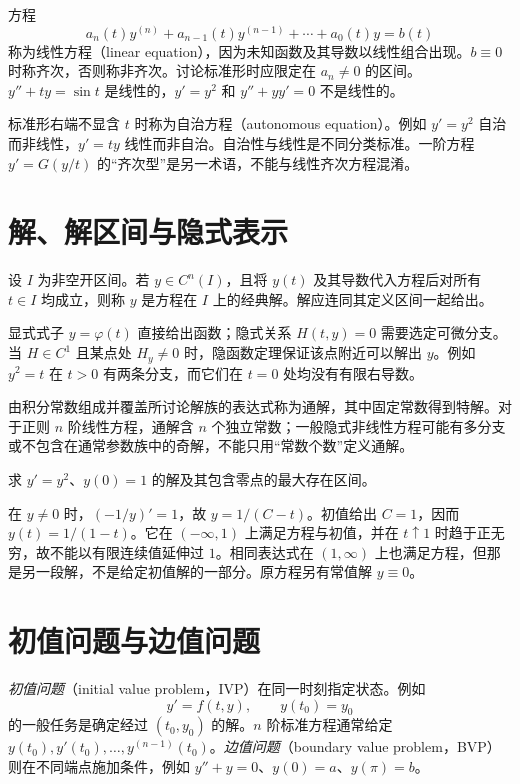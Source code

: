 方程
\begin{equation}
 a_n(t)y^{(n)}+a_{n-1}(t)y^{(n-1)}+\cdots+a_0(t)y=b(t)
 \label{eq:ode-general-linear}
\end{equation}
称为线性方程（linear equation），因为未知函数及其导数以线性组合出现。$b\equiv0$ 时称齐次，否则称非齐次。讨论标准形时应限定在 $a_n\ne0$ 的区间。$y''+ty=\sin t$ 是线性的，$y'=y^2$ 和 $y''+yy'=0$ 不是线性的。

标准形右端不显含 $t$ 时称为自治方程（autonomous equation）。例如 $y'=y^2$ 自治而非线性，$y'=ty$ 线性而非自治。自治性与线性是不同分类标准。一阶方程 $y'=G(y/t)$ 的“齐次型”是另一术语，不能与线性齐次方程混淆。

\section{解、解区间与隐式表示}
\begin{definition}
设 $I$ 为非空开区间。若 $y\in C^n(I)$，且将 $y(t)$ 及其导数代入方程后对所有 $t\in I$ 均成立，则称 $y$ 是方程在 $I$ 上的经典解。解应连同其定义区间一起给出。
\end{definition}

显式式子 $y=\varphi(t)$ 直接给出函数；隐式关系 $H(t,y)=0$ 需要选定可微分支。当 $H\in C^1$ 且某点处 $H_y\ne0$ 时，隐函数定理保证该点附近可以解出 $y$。例如 $y^2=t$ 在 $t>0$ 有两条分支，而它们在 $t=0$ 处均没有有限右导数。

由积分常数组成并覆盖所讨论解族的表达式称为通解，其中固定常数得到特解。对于正则 $n$ 阶线性方程，通解含 $n$ 个独立常数；一般隐式非线性方程可能有多分支或不包含在通常参数族中的奇解，不能只用“常数个数”定义通解。

\begin{example}[表达式与最大区间]
求 $y'=y^2$、$y(0)=1$ 的解及其包含零点的最大存在区间。
\end{example}
\begin{solve}
在 $y\ne0$ 时，$(-1/y)'=1$，故 $y=1/(C-t)$。初值给出 $C=1$，因而 $y(t)=1/(1-t)$。它在 $(-\infty,1)$ 上满足方程与初值，并在 $t\uparrow1$ 时趋于正无穷，故不能以有限连续值延伸过 $1$。相同表达式在 $(1,\infty)$ 上也满足方程，但那是另一段解，不是给定初值解的一部分。原方程另有常值解 $y\equiv0$。
\end{solve}

\section{初值问题与边值问题}
\emph{初值问题}（initial value problem，IVP）在同一时刻指定状态。例如
\begin{equation}
 y'=f(t,y),\qquad y(t_0)=y_0
 \label{eq:ode-scalar-ivp}
\end{equation}
的一般任务是确定经过 $(t_0,y_0)$ 的解。$n$ 阶标准方程通常给定 $y(t_0),y'(t_0),\ldots,y^{(n-1)}(t_0)$。\emph{边值问题}（boundary value problem，BVP）则在不同端点施加条件，例如 $y''+y=0$、$y(0)=a$、$y(\pi)=b$。

